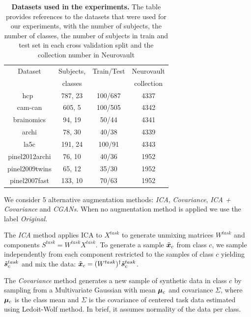 \begin{table}
\begin{center}
\begin{tabular}{c|c|c|c}
\hline
Dataset & Subjects, & Train/Test & Neurovault \\
 & classes  &  & collection 
\\ \hline
hcp~\cite{van2013wu}  & 787, 23 & 100/687  &  4337
\\
cam-can \cite{shafto2014cambridge}  & 605, 5 & 100/505  &  4342
\\
brainomics \cite{orfanos2017brainomics}  & 94, 19 & 50/44  &   4341
\\
archi \cite{pinel2019functional}  & 78, 30 & 40/38  &  4339
\\
la5c \cite{poldrack2016phenome}  & 191, 24 & 100/91  &  4343
\\
pinel2012archi \cite{pinel2019functional} & 76, 10 & 40/36  &  1952
\\
pinel2009twins \cite{pinel2013genetic}  & 65, 12 & 35/30  &  1952
\\
pinel2007fast \cite{pinel2007fast} & 133, 10 & 70/63  &  1952
\\\hline\hline
\end{tabular}
\end{center}
\caption{\textbf{Datasets used in the experiments.} The table provides
  references to the datasets that were used for our experiments, with
  the number of subjects, the number of classes, the number of subjects in train
  and test set in each cross validation split and the collection number in Neurovault}
  \label{fig:dataset:tab}
\end{table}


We consider 5 alternative
augmentation methods: \emph{ICA}, \emph{Covariance}, \emph{ICA + Covariance} and \emph{CGANs}.
%
When no augmentation method is applied we use the label \emph{Original}.

The \emph{ICA} method applies ICA to $X^{task}$ to generate unmixing matrices $W^{task}$ and
components $S^{task}=  W^{task} X^{task}$.
%
To generate a sample $\tilde{\boldsymbol{x}}_c$ from class $c$, we sample
independently from each component restricted to the samples of class $c$ yielding $\tilde{\boldsymbol{s}}^{task}_c$ and mix the data: $\tilde{\boldsymbol{x}}_c = (W^{task})^{\dagger}
\tilde{\boldsymbol{s}}^{task}_c$.
%

The \emph{Covariance} method generates a new sample of
synthetic data in class $c$ by sampling from a Multivariate Gaussian
with mean $\boldsymbol{\mu}_c$ and covariance $\Sigma$, where $\boldsymbol{\mu}_c$ is the
class mean and $\Sigma$ is the covariance of centered task data
estimated using Ledoit-Wolf method.
%
In brief, it assumes normality of the data per class.

